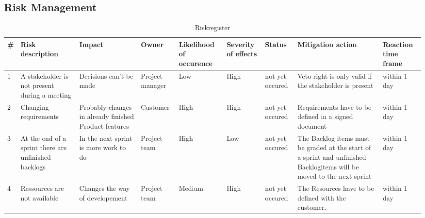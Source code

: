     \subsection{Risk Management}
    \begin{sidewaystable}[]
        \centering
        \begin{tabularx}{\textwidth}{X X X X X X X X X}
        \hline
        \textbf{\#} & \textbf{Risk description}                                & \textbf{Impact}                                       & \textbf{Owner}  & \textbf{Likelihood of occurence} & \textbf{Severity of effects} & \textbf{Status} & \textbf{Mitigation action}                                                                                             & \textbf{Reaction time frame}  \\ \hline
        1               & A stakeholder is not present during a meeting        & Decisions can't be made                               & Project manager & Low                              & High                         & not yet occured & Veto right is only valid if the stakeholder is present                                                                 & within 1 day                  \\ \hline
        2               & Changing requirements                                & Probably changes in already finished Product features & Customer        & High                             & High                         & not yet occured & Requirements have to be defined in a signed document                                                                   & within 1 day                  \\ \hline
        3               & At the end of a sprint there are unfinished backlogs & In the next sprint is more work to do                 & Project team    & High                             & Low                          & not yet occured & The Backlog items must be graded at the start of a sprint and unfinished Backlogitems will be moved to the next sprint & within 1 day                  \\ \hline
        4               & Ressources are not available                         & Changes the way of developement                       & Project team    & Medium                           & High                         & not yet occured & The Resources have to be defined with the customer.                                                                    & within 1 day                  \\ \hline
        \end{tabularx}
        \caption{Riskregister}
    \end{sidewaystable}
    
